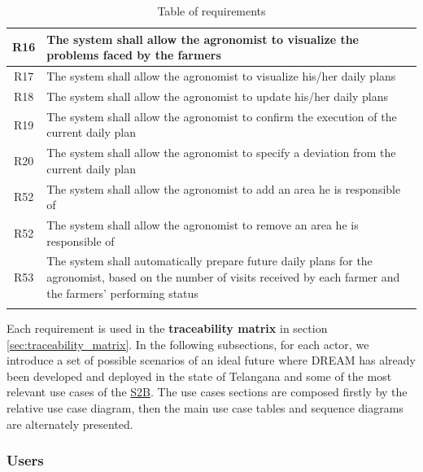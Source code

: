 \begin{center}
\begin{longtable}{|c|m{}|}
            \hline
            \textsc{R16}  &    The system shall allow the agronomist to visualize the problems faced by the farmers  \\
            \hline
            \textsc{R17}  &    The system shall allow the agronomist to visualize his/her daily plans  \\
            \hline
            \textsc{R18}  &    The system shall allow the agronomist to update his/her daily plans  \\
            \hline
            \textsc{R19}  &    The system shall allow the agronomist to confirm the execution of the current daily plan  \\
            \hline
            \textsc{R20}  &    The system shall allow the agronomist to specify a deviation from the current daily plan  \\
            \hline
            \textsc{R52}  &    The system shall allow the agronomist to add an area he is responsible of  \\
            \hline
            \textsc{R52}  &    The system shall allow the agronomist to remove an area he is responsible of  \\
            \hline
            \textsc{R53}  &    The system shall automatically prepare future daily plans for the agronomist, based on the number of visits received by each farmer and the farmers' performing status  \\
            \hline
        
        \rowcolor{white}\caption{\label{tab:requirements}Table of requirements}
        
    \end{longtable}
\end{center}

Each requirement is used in the \textbf{traceability matrix} in section \ref{sec:traceability_matrix}.
In the following subsections, for each actor, we introduce a set of possible scenarios of an ideal future where DREAM has already been developed and deployed in the state of Telangana and some of the most relevant use cases of the \hyperref[tab:acronymsTable]{S2B}. The use cases sections are composed firstly by the relative use case diagram, then the main use case tables and sequence diagrams are alternately presented.

\subsubsection{Users}
\label{sect:users_requirements}





